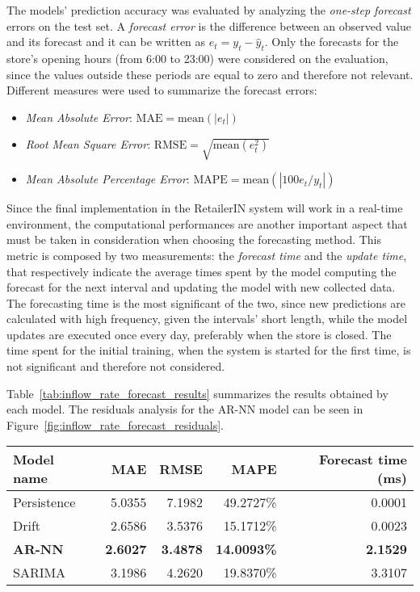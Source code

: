 The models’ prediction accuracy was evaluated by analyzing the \emph{one-step forecast} errors on the test set. A \emph{forecast error} is the difference between an observed value and its forecast and it can be written as \( e_t = y_t - \hat{y}_t \). Only the forecasts for the store’s opening hours (from 6:00 to 23:00) were considered on the evaluation, since the values outside these periods are equal to zero and therefore not relevant. Different measures were used to summarize the forecast errors:
\begin{itemize}
  \item \emph{Mean Absolute Error}: \( \text{MAE} = \text{mean}(| e_t |) \)
  \item \emph{Root Mean Square Error}: \( \text{RMSE} = \sqrt{\text{mean}(e_t^2)} \)
  \item \emph{Mean Absolute Percentage Error}: \( \text{MAPE} =  \text{mean}(| 100 e_t / y_t |) \)
\end{itemize}

Since the final implementation in the RetailerIN system will work in a real-time environment, the computational performances are another important aspect that must be taken in consideration when choosing the forecasting method. This metric is composed by two measurements: the \emph{forecast time} and the \emph{update time}, that respectively indicate the average times spent by the model computing the forecast for the next interval and updating the model with new collected data. The forecasting time is the most significant of the two, since new predictions are calculated with high frequency, given the intervals’ short length, while the model updates are executed once every day, preferably when the store is closed. The time spent for the initial training, when the system is started for the first time, is not significant and therefore not considered.

Table~\ref{tab:inflow_rate_forecast_results} summarizes the results obtained by each model. The residuals analysis for the AR-NN model can be seen in Figure~\ref{fig:inflow_rate_forecast_residuals}.

\begin{center}
  \begin{tabular}{ l r r r r }
    \hline
    Model name     & MAE             & RMSE            & MAPE               & Forecast time (ms) \\
    \hline
    Persistence    & 5.0355          & 7.1982          & 49.2727\%          & 0.0001             \\
    Drift          & 2.6586          & 3.5376          & 15.1712\%          & 0.0023             \\
    \textbf{AR-NN} & \textbf{2.6027} & \textbf{3.4878} & \textbf{14.0093\%} & \textbf{2.1529}    \\
    SARIMA         & 3.1986          & 4.2620          & 19.8370\%          & 3.3107             \\
    \hline
  \end{tabular}
\end{center}


